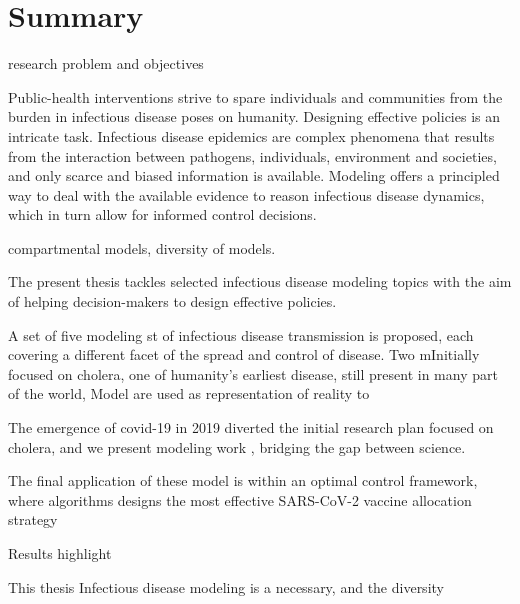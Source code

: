 

 
 \chapter*{Summary} 
 research problem and objectives

Public-health interventions strive to spare individuals and communities from the burden in infectious disease poses on humanity. Designing effective policies is an intricate task. Infectious disease epidemics are complex phenomena that results from the interaction between pathogens, individuals, environment and societies, and only scarce and biased information is available.  Modeling offers a principled way to deal with the available evidence to reason infectious disease dynamics, which in turn allow for informed control decisions.



compartmental models, diversity of models.

The present thesis tackles selected infectious disease modeling topics with the aim of helping decision-makers to design effective policies. 

A set of five modeling st of infectious disease transmission is proposed, each covering a different facet of the spread and control of disease.
Two mInitially focused on cholera, one of humanity's earliest disease, still present in many part of the world,  Model are used as representation of reality to 

The emergence of covid-19 in 2019 diverted the initial research plan focused on cholera, and we present modeling work , bridging the gap between science.


The final application of these model is within an optimal control framework, where algorithms designs the most effective SARS-CoV-2 vaccine allocation strategy




Results highlight 


This thesis Infectious disease modeling is a necessary, and the diversity 
 
